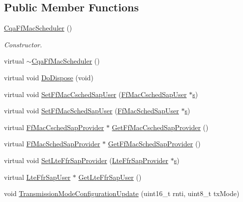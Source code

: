 \subsection*{Public Member Functions}
\begin{DoxyCompactItemize}
\item 
\hyperlink{classns3_1_1CqaFfMacScheduler_ad7df3a4ee9e26114dad4d8b9572be9f8}{Cqa\+Ff\+Mac\+Scheduler} ()
\begin{DoxyCompactList}\small\item\em Constructor. \end{DoxyCompactList}\item 
virtual \hyperlink{classns3_1_1CqaFfMacScheduler_a56477bfe75cb8023f4c723209f7dcf46}{$\sim$\+Cqa\+Ff\+Mac\+Scheduler} ()
\item 
virtual void \hyperlink{classns3_1_1CqaFfMacScheduler_af41d8f0979c15b4766c2e1ac955ab0b9}{Do\+Dispose} (void)
\item 
virtual void \hyperlink{classns3_1_1CqaFfMacScheduler_abf9edc89587cd146800984e6af00093f}{Set\+Ff\+Mac\+Csched\+Sap\+User} (\hyperlink{classns3_1_1FfMacCschedSapUser}{Ff\+Mac\+Csched\+Sap\+User} $\ast$\hyperlink{generate__test__data__lte__sinr_8m_ad83eeb3a142285d1243a08c6b7026df8}{s})
\item 
virtual void \hyperlink{classns3_1_1CqaFfMacScheduler_a359c2f26a02581e76c24e96401c7dd6a}{Set\+Ff\+Mac\+Sched\+Sap\+User} (\hyperlink{classns3_1_1FfMacSchedSapUser}{Ff\+Mac\+Sched\+Sap\+User} $\ast$\hyperlink{generate__test__data__lte__sinr_8m_ad83eeb3a142285d1243a08c6b7026df8}{s})
\item 
virtual \hyperlink{classns3_1_1FfMacCschedSapProvider}{Ff\+Mac\+Csched\+Sap\+Provider} $\ast$ \hyperlink{classns3_1_1CqaFfMacScheduler_a10a557a588e6e800ba70881fc6200af8}{Get\+Ff\+Mac\+Csched\+Sap\+Provider} ()
\item 
virtual \hyperlink{classns3_1_1FfMacSchedSapProvider}{Ff\+Mac\+Sched\+Sap\+Provider} $\ast$ \hyperlink{classns3_1_1CqaFfMacScheduler_ac477bb0942f3059310a3d78e34ad8ccf}{Get\+Ff\+Mac\+Sched\+Sap\+Provider} ()
\item 
virtual void \hyperlink{classns3_1_1CqaFfMacScheduler_a6d95a5cdb82a3ad621f9dc6719f8cec2}{Set\+Lte\+Ffr\+Sap\+Provider} (\hyperlink{classns3_1_1LteFfrSapProvider}{Lte\+Ffr\+Sap\+Provider} $\ast$\hyperlink{generate__test__data__lte__sinr_8m_ad83eeb3a142285d1243a08c6b7026df8}{s})
\item 
virtual \hyperlink{classns3_1_1LteFfrSapUser}{Lte\+Ffr\+Sap\+User} $\ast$ \hyperlink{classns3_1_1CqaFfMacScheduler_ad4e60ee95b33ea19869da62cd29ef812}{Get\+Lte\+Ffr\+Sap\+User} ()
\item 
void \hyperlink{classns3_1_1CqaFfMacScheduler_afe30372c616909013b09657941963551}{Transmission\+Mode\+Configuration\+Update} (uint16\+\_\+t rnti, uint8\+\_\+t tx\+Mode)
\end{DoxyCompactItemize}
